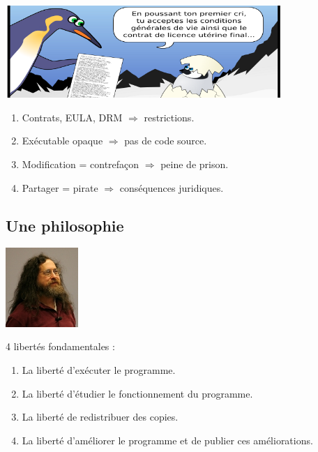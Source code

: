 \documentclass[english]{beamer}
\begin{document}
\begin{frame}[t]{}
  \vspace{-2.5em}
  \begin{center}
    \includegraphics[height=3.5cm]{eula.png}
  \end{center}
  \vspace{-1em}
  \begin{enumerate}
  \item <2-> Contrats, EULA, DRM $ \Rightarrow $ restrictions.
  \item <3-> Exécutable opaque $ \Rightarrow $ pas de code source.
  \item <4-> Modification = contrefaçon $ \Rightarrow $ peine de prison.
  \item <5-> Partager = pirate $ \Rightarrow $ conséquences juridiques.
  \end{enumerate}

  \begin{center}
  \end{center}
\end{frame}

\subsection{Une philosophie}

\begin{frame}[t]{}
  \vspace{-2em}
  \begin{center}
    \includegraphics[height=3cm]{stallman.png}
  \end{center}

  4 libertés fondamentales :
  \vspace{1em}
  \begin{enumerate}
  \item <2-> La liberté d'exécuter le programme.
  \item <3-> La liberté d'étudier le fonctionnement du programme.
  \item <4-> La liberté de redistribuer des copies.
  \item <5-> La liberté d'améliorer le programme et de publier ces améliorations.
  \end{enumerate}
  \vfill
\end{frame}
\end{document}
